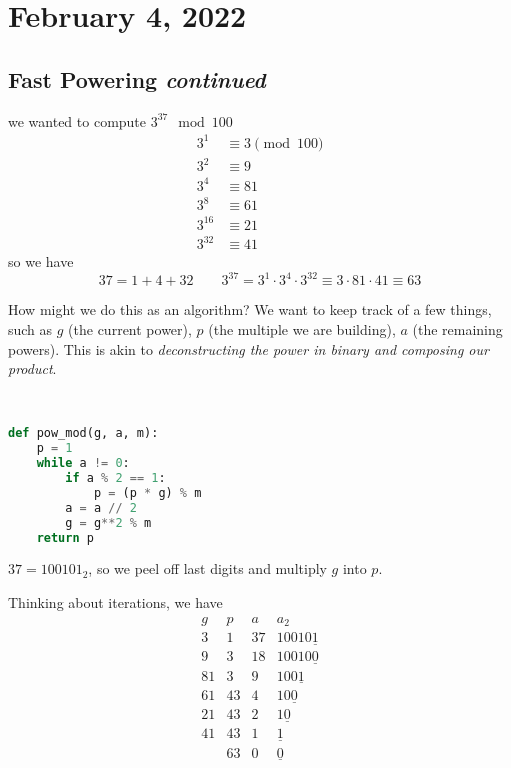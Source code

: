 \section{February 4, 2022}
\subsection{Fast Powering \emph{continued}}
\begin{example}
    \recall we wanted to compute $3^{37}\mod 100$
    \begin{align*}
        3^1    & \equiv 3\pmod{100} \\
        3^2    & \equiv 9           \\
        3^4    & \equiv 81          \\
        3^8    & \equiv 61          \\
        3^{16} & \equiv 21          \\
        3^{32} & \equiv 41
    \end{align*}
    so we have
    \[37=1+4+32 \qquad 3^{37} = 3^1\cdot 3^4\cdot 3^{32} \equiv 3\cdot 81\cdot 41\equiv 63\]
\end{example}
How might we do this as an algorithm? We want to keep track of a few things, such as $g$ (the current power), $p$ (the multiple we are building), $a$ (the remaining powers). This is akin to \emph{deconstructing the power in binary and composing our product}.

\begin{algorithm}
    ~\begin{lstlisting}[numbers=none,language=Python]
def pow_mod(g, a, m):
    p = 1
    while a != 0:
        if a % 2 == 1:
            p = (p * g) % m
        a = a // 2
        g = g**2 % m
    return p
    \end{lstlisting}
\end{algorithm}

\begin{example}
    $37=100101_2$, so we peel off last digits and multiply $g$ into $p$.

    Thinking about iterations, we have
    \[\begin{array}{llll}
            g  & p          & a  & a_2                \\ \hline
            3  & 1          & 37 & 10010\underline{1} \\
            9  & 3          & 18 & 10010\underline{0} \\
            81 & 3          & 9  & 100\underline{1}   \\
            61 & 43         & 4  & 10\underline{0}    \\
            21 & 43         & 2  & 1\underline{0}     \\
            41 & 43         & 1  & \underline{1}      \\
               & \boxed{63} & 0  & \underline{0}
        \end{array}\]
\end{example}

